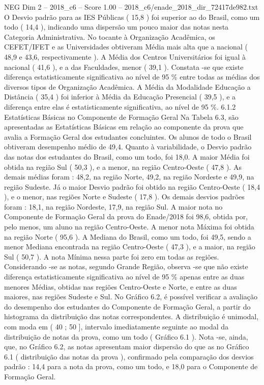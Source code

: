 \begin{textsample}{NEG Dim 2 – 2018\_c6 – Score 1.00 – 2018\_c6/enade\_2018\_dir\_72417de982.txt}
O Desvio padrão para as IES Públicas ( 15,8 ) foi superior ao do Brasil, como um todo ( 14,4 ), indicando uma dispersão um pouco maior das notas nesta Categoria Administrativa.
No tocante à Organização Acadêmica, os CEFET/IFET e as Universidades obtiveram Média mais alta que a nacional ( 48,9 e 43,6, respectivamente ).
A Média dos Centros Universitários foi igual à nacional ( 41,6 ), e a das Faculdades, menor ( 39,1 ).
Constata -se que existe diferença estatisticamente significativa ao nível de 95 \% entre todas as médias dos diversos tipos de Organização Acadêmica.
A Média da Modalidade Educação a Distância ( 35,4 ) foi inferior à Média da Educação Presencial ( 39,5 ), e a diferença entre elas é estatisticamente significativa, ao nível de 95 \%. 6.1.2 Estatísticas Básicas no Componente de Formação Geral Na Tabela 6.3, são apresentadas as Estatísticas Básicas em relação ao componente da prova que avalia a Formação Geral dos estudantes concluintes.
Os alunos de todo o Brasil obtiveram desempenho médio de 49,4.
Quanto à variabilidade, o Desvio padrão das notas dos estudantes do Brasil, como um todo, foi 18,0.
A maior Média foi obtida na região Sul ( 50,3 ), e a menor, na região Centro-Oeste ( 47,8 ).
As demais médias foram : 48,2, na região Norte, 49,2, na região Nordeste e 49,9, na região Sudeste.
Já o maior Desvio padrão foi obtido na região Centro-Oeste ( 18,4 ), e o menor, nas regiões Norte e Sudeste ( 17,8 ).
Os demais desvios padrões foram : 18,1, na região Nordeste, 17,9, na região Sul.
A maior nota no Componente de Formação Geral da prova do Enade/2018 foi 98,6, obtida por, pelo menos, um aluno na região Centro-Oeste.
A menor nota Máxima foi obtida na região Norte ( 95,6 ).
A Mediana do Brasil, como um todo, foi 49,5, sendo a menor Mediana encontrada na região Centro-Oeste ( 47,3 ), e a maior, na região Sul ( 50,7 ).
A nota Mínima nessa parte foi zero em todas as regiões.
Considerando -se as notas, segundo Grande Região, observa -se que não existe diferença estatisticamente significativa ao nível de 95 \% apenas entre as duas menores Médias, obtidas nas regiões Centro-Oeste e Norte, e entre as duas maiores, nas regiões Sudeste e Sul.
No Gráfico 6.2, é possível verificar a avaliação do desempenho dos estudantes do Componente de Formação Geral, a partir do histograma da distribuição das notas correspondentes.
A distribuição é unimodal, com moda em ( 40 ; 50 ], intervalo imediatamente seguinte ao modal da distribuição de notas da prova, como um todo ( Gráfico 6.1 ).
Nota -se, ainda, que, no Gráfico 6.2, as notas apresentam maior dispersão do que as no Gráfico 6.1 ( distribuição das notas da prova ), confirmado pela comparação dos desvios padrão : 14,4 para a nota da prova, como um todo, e 18,0 para o Componente de Formação Geral.

\end{textsample}
